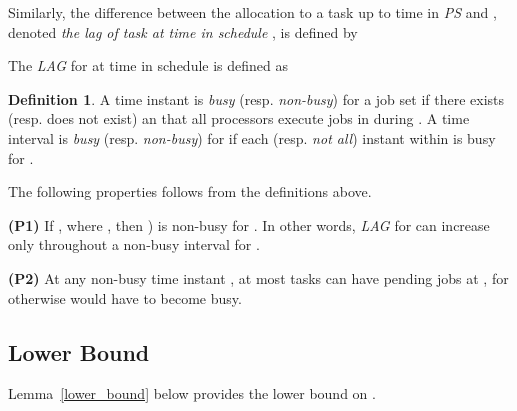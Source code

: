 \documentclass[Times, 10pt,twocolumn]{article}
\theoremstyle{definition}
\newtheorem{definition}{\textbf{Definition}}
\begin{document}
Similarly, the difference between the allocation to a task  up to time  in  \textit{PS} and , denoted \textit{the lag of task  at time  in schedule }, is defined by\small

\normalsize

The \textit{LAG} for  at time  in schedule  is defined as






\begin{definition}
A time instant  is \textit{busy} (resp. \textit{non-busy}) for a job set  if there exists (resp. does not exist) an  that all  processors execute jobs in  during . A time interval  is \textit{busy} (resp. \textit{non-busy}) for  if each (resp. \textit{not all}) instant within  is busy for . \end{definition}

The following properties follows from the definitions above.

\begin{changemargin}{4mm}{4mm}
\textbf{(P1)} If , where , then ) is non-busy for . In other words, \textit{LAG} for  can increase only throughout a non-busy interval for  . 
\end{changemargin}



\begin{changemargin}{4mm}{4mm}
\textbf{(P2)} At any non-busy time instant , at most  tasks can have pending jobs at , for otherwise  would have to become busy. 
\end{changemargin}







\subsection{Lower Bound}
\label{sec:lower_bound}

Lemma~\ref{lower_bound} below provides the lower bound on .
\end{document}
